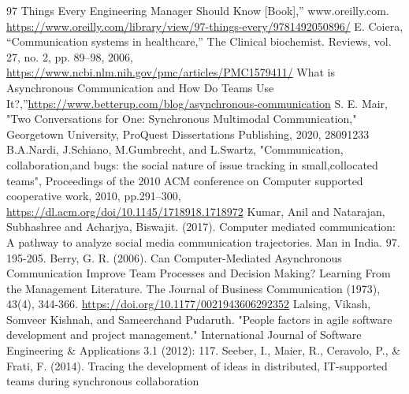 \documentclass[runningheads]{llncs}
\begin{document}
    \begin{thebibliography}{8}
        97 Things Every Engineering Manager Should Know [Book],” www.oreilly.com. \url{https://www.oreilly.com/library/view/97-things-every/9781492050896/}
        E. Coiera, “Communication systems in healthcare,” The Clinical biochemist. Reviews, vol. 27, no. 2, pp. 89–98, 2006, \url{https://www.ncbi.nlm.nih.gov/pmc/articles/PMC1579411/} 
        What is Asynchronous Communication and How Do Teams Use It?,”\url{https://www.betterup.com/blog/asynchronous-communication}
        S. E. Mair, "Two Conversations for One: Synchronous Multimodal Communication," Georgetown University, ProQuest Dissertations Publishing, 2020, 28091233
        B.A.Nardi, J.Schiano, M.Gumbrecht, and L.Swartz, "Communication, collaboration,and bugs: the social nature of issue tracking in small,collocated teams", Proceedings of the 2010 ACM conference on Computer supported cooperative work, 2010, pp.291–300, \url{https://dl.acm.org/doi/10.1145/1718918.1718972}
        Kumar, Anil and Natarajan, Subhashree and Acharjya, Biswajit. (2017). Computer mediated communication: A pathway to analyze social media communication trajectories. Man in India. 97. 195-205.
        Berry, G. R. (2006). Can Computer-Mediated Asynchronous Communication Improve Team Processes and Decision Making? Learning From the Management Literature. The Journal of Business Communication (1973), 43(4), 344-366. \url{https://doi.org/10.1177/0021943606292352}
        Lalsing, Vikash, Somveer Kishnah, and Sameerchand Pudaruth. "People factors in agile software development and project management." International Journal of Software Engineering \& Applications 3.1 (2012): 117.
        Seeber, I., Maier, R., Ceravolo, P., \& Frati, F. (2014). Tracing the development of ideas in distributed, IT-supported teams during synchronous collaboration
    \end{thebibliography}
    
\end{document}
